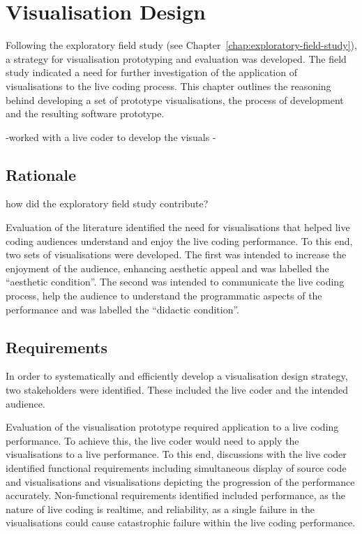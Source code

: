 
\chapter{Visualisation Design}
\label{chap:visualisation-design}

Following the exploratory field study (see Chapter~\ref{chap:exploratory-field-study}), a strategy for visualisation prototyping and evaluation was developed. The field study indicated a need for further investigation of the application of visualisations to the live coding process. This chapter outlines the reasoning behind developing a set of prototype visualisations, the process of development and the resulting software prototype.

-worked with a live coder to develop the visuals
-



\section{Rationale}

{\color{red} how did the exploratory field study contribute? }

Evaluation of the literature identified the need for visualisations that helped live coding audiences understand and enjoy the live coding performance. To this end, two sets of visualisations were developed. The first was intended to increase the enjoyment of the audience, enhancing aesthetic appeal and was labelled the ``aesthetic condition''. The second was intended to communicate the live coding process, help the audience to understand the programmatic aspects of the performance and was labelled the ``didactic condition''.

\section{Requirements}

In order to systematically and efficiently develop a visualisation design strategy, two stakeholders were identified. These included the live coder and the intended audience.

Evaluation of the visualisation prototype required application to a live coding performance. To achieve this, the live coder would need to apply the visualisations to a live performance. To this end, discussions with the live coder identified functional requirements including simultaneous display of source code and visualisations and visualisations depicting the progression of the performance accurately. Non-functional requirements identified included performance, as the nature of live coding is realtime, and reliability, as a single failure in the visualisations could cause catastrophic failure within the live coding performance.

